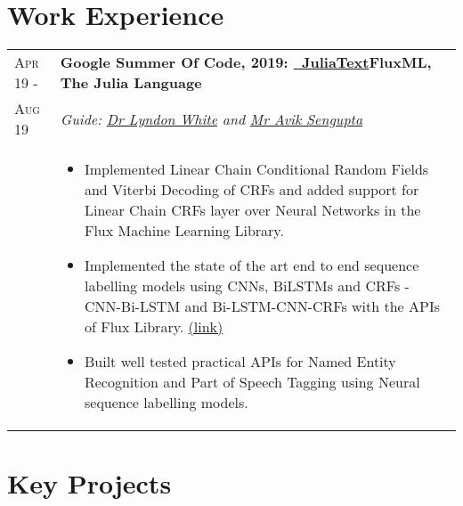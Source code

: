 \documentclass[a4paper,10pt]{extarticle} %
\begin{document}
\section{\textcolor{primary}{Work Experience}}

\begin{tabularx}{\linewidth}{ l | X }

\textsc{Apr 19 -} & \textbf{Google Summer Of Code, 2019: {\href{https://github.com/JuliaText}{\ JuliaText}}}\hfill\textbf{FluxML, The Julia Language}\\
    \textsc{Aug 19}& {\textit{Guide: \href{https://www.linkedin.com/in/lyndon-white-46b9a035/}{Dr Lyndon White} and \href{https://www.linkedin.com/in/aviks}{Mr Avik Sengupta}}} \\
    & \begin{itemize}[leftmargin=.1in]
        \item Implemented Linear Chain Conditional Random Fields and Viterbi Decoding of CRFs and added support for  Linear Chain CRFs layer over Neural Networks in the Flux Machine Learning Library.
        \item Implemented the state of the art end to end sequence labelling models using CNNs, BiLSTMs and CRFs - CNN-Bi-LSTM and Bi-LSTM-CNN-CRFs with the APIs of Flux Library.  \href{https://github.com/Ayushk4/NER.jl/tree/master/Sequence_models}{(link)}
        \item Built well tested practical APIs for Named Entity Recognition and Part of Speech Tagging using Neural sequence labelling models.
    \end{itemize}
\end{tabularx}

\section{\textcolor{primary}{Key Projects}}
\end{document}
